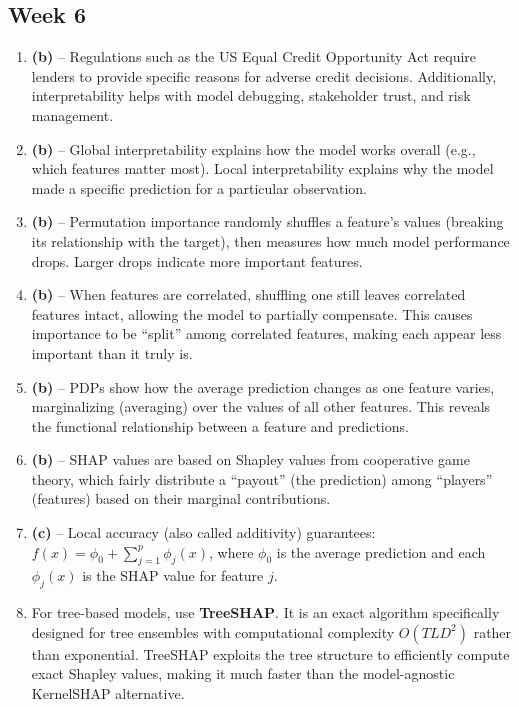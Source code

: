 \documentclass[11pt]{article}
\begin{document}
\subsection*{Week 6}

\begin{enumerate}[label=\textbf{\arabic*.}, leftmargin=*, itemsep=6pt, start=18]
  \item \textbf{(b)} -- Regulations such as the US Equal Credit Opportunity Act require lenders to provide specific reasons for adverse credit decisions. Additionally, interpretability helps with model debugging, stakeholder trust, and risk management.
  
  \item \textbf{(b)} -- Global interpretability explains how the model works overall (e.g., which features matter most). Local interpretability explains why the model made a specific prediction for a particular observation.
  
  \item \textbf{(b)} -- Permutation importance randomly shuffles a feature's values (breaking its relationship with the target), then measures how much model performance drops. Larger drops indicate more important features.
  
  \item \textbf{(b)} -- When features are correlated, shuffling one still leaves correlated features intact, allowing the model to partially compensate. This causes importance to be ``split'' among correlated features, making each appear less important than it truly is.
  
  \item \textbf{(b)} -- PDPs show how the average prediction changes as one feature varies, marginalizing (averaging) over the values of all other features. This reveals the functional relationship between a feature and predictions.
  
  \item \textbf{(b)} -- SHAP values are based on Shapley values from cooperative game theory, which fairly distribute a ``payout'' (the prediction) among ``players'' (features) based on their marginal contributions.
  
  \item \textbf{(c)} -- Local accuracy (also called additivity) guarantees: $f(x) = \phi_0 + \sum_{j=1}^{p} \phi_j(x)$, where $\phi_0$ is the average prediction and each $\phi_j(x)$ is the SHAP value for feature $j$.
  
  \item For tree-based models, use \textbf{TreeSHAP}. It is an exact algorithm specifically designed for tree ensembles with computational complexity $O(TLD^2)$ rather than exponential. TreeSHAP exploits the tree structure to efficiently compute exact Shapley values, making it much faster than the model-agnostic KernelSHAP alternative.
\end{enumerate}
\end{document}
